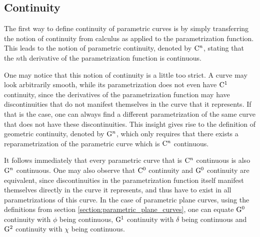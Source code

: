 \documentclass[a4paper]{article}
\begin{document}
		\subsection{Continuity}
		\label{section:continuity}

			The first way to define continuity of parametric curves is by simply transferring the notion of continuity from calculus as applied to the parametrization function. This leads to the notion of parametric continuity, denoted by \(\mathrm{C}^{n}\), stating that the \(n\)th derivative of the parametrization function is continuous.

			One may notice that this notion of continuity is a little too strict. A curve may look arbitrarily smooth, while its parametrization does not even have \(\mathrm{C}^{1}\) continuity, since the derivatives of the parametrization function may have discontinuities that do not manifest themselves in the curve that it represents. If that is the case, one can always find a different parametrization of the same curve that does not have these discontinuities. This insight gives rise to the definition of geometric continuity, denoted by \(\mathrm{G}^{n}\), which only requires that there exists a reparametrization of the parametric curve which is \(\mathrm{C}^{n}\) continuous.

			It follows immediately that every parametric curve that is \(\mathrm{C}^{n}\) continuous is also \(\mathrm{G}^{n}\) continuous. One may also observe that \(\mathrm{C}^{0}\) continuity and \(\mathrm{G}^{0}\) continuity are equivalent, since discontinuities in the parametrization function itself manifest themselves directly in the curve it represents, and thus have to exist in all parametrizations of this curve. In the case of parametric plane curves, using the definitions from section \ref{section:parametric_plane_curves}, one can equate \(\mathrm{G}^{0}\) continuity with \(\phi\) being continuous, \(\mathrm{G}^{1}\) continuity with \(\delta\) being continuous and \(\mathrm{G}^{2}\) continuity with \(\chi\) being continuous.
\end{document}
